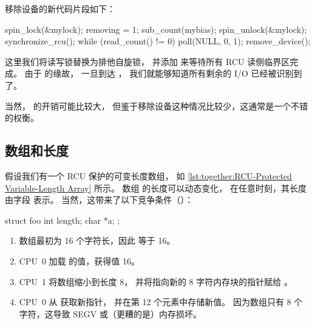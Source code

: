 移除设备的新代码片段如下：

\begin{fcvlabel}
\begin{VerbatimN}[tabsize=8,commandchars=\\\[\]]
spin_lock(&mylock);
removing = 1;
sub_count(mybias);
spin_unlock(&mylock);
synchronize_rcu();
while (read_count() != 0) {	\lnlbl[nextofsync]
	poll(NULL, 0, 1);
}
remove_device();
\end{VerbatimN}
\end{fcvlabel}

\begin{fcvref}
这里我们将读写锁替换为排他自旋锁，
并添加  来等待所有 RCU 读侧临界区完成。
由于  的缘故，
一旦到达 ，
我们就能够知道所有剩余的 I/O 已经被识别到了。

当然， 的开销可能比较大，
但鉴于移除设备这种情况比较少，这通常是一个不错的权衡。
\end{fcvref}

\FloatBarrier
\subsection{数组和长度}
\label{sec:together:Array and Length}

假设我们有一个 RCU 保护的可变长度数组，
如 \cref{lst:together:RCU-Protected Variable-Length Array} 所示。
数组  的长度可以动态变化，
在任意时刻，其长度由字段  表示。
当然，这带来了以下竞争条件（）：

\begin{listing}
\begin{VerbatimL}[tabsize=8]
struct foo {
	int length;
	char *a;
};
\end{VerbatimL}
\caption{RCU 保护的可变长度数组}
\label{lst:together:RCU-Protected Variable-Length Array}
\end{listing}

\begin{enumerate}
\item	数组最初为 16 个字符长，因此  等于 16。
\item	CPU~0 加载  的值，获得值 16。
\item	CPU~1 将数组缩小到长度 8，
	并将指向新的 8 字符内存块的指针赋给 。
\item	CPU~0 从  获取新指针，
	并在第 12 个元素中存储新值。
	因为数组只有 8 个字符，这导致
	SEGV 或（更糟的是）内存损坏。
\end{enumerate}

